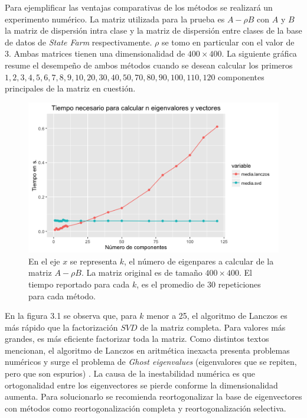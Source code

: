 Para ejemplificar las ventajas comparativas de los métodos se realizará un experimento numérico. La matriz utilizada para la prueba es $A - \rho B$ con $A$ y $B$ la matriz de dispersión intra clase y la matriz de dispersión entre clases de la base de datos de \textit{State Farm} respectivamente. $\rho$ se tomo en particular con el valor de 3. Ambas matrices tienen una dimensionalidad de $400 \times 400$. La siguiente gráfica resume el desempeño de ambos métodos cuando se desean calcular los primeros $1, 2, 3, 4, 5, 6, 7, 8, 9, 10, 20, 30, 40, 50, 70, 80,  90, 100,  110, 120$ componentes principales de la matriz en cuestión.

\pagebreak

\begin{figure}[!ht]
  \centering
  \includegraphics[width=1\textwidth]{Figures/Chapter4_eigen_lanczos_actuaria.png} 
  \caption[Desempeño de Lanczos]
  {En el eje $x$ se representa $k$, el número de eigenpares a calcular de la matriz $A- \rho B$. La matriz original es de tamaño $400 \times 400$. El tiempo reportado para cada $k$, es el promedio de $30$ repeticiones para cada método.}
\end{figure}

En la figura 3.1 se observa que, para $k$ menor a 25, el algoritmo de Lanczos es más rápido que la factorización $SVD$ de la matriz completa. Para valores más grandes, es más eficiente factorizar toda la matriz. Como distintos textos mencionan, el algoritmo de Lanczos en aritmética inexacta presenta problemas numéricos y surge el problema de \textit{Ghost eigenvalues} (eigenvalores que se repiten, pero que son espurios) \cite{golub2012matrix}. La causa de la inestabilidad numérica es que ortogonalidad entre los eigenvectores se pierde conforme la dimensionalidad aumenta. Para solucionarlo se recomienda reortogonalizar la base de eigenvectores con métodos como reortogonalización completa y reortogonalización selectiva. \cite{demmel1997applied}

